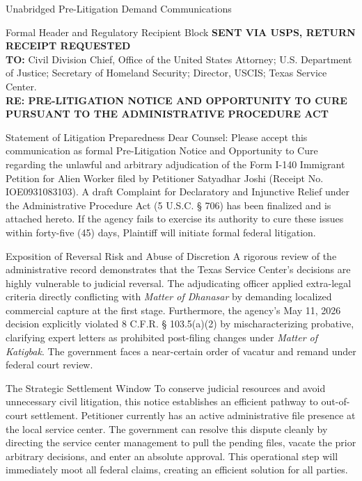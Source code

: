 \documentclass[11pt]{beamer}
\begin{document}
	\begin{frame}[allowframebreaks]{Unabridged Pre-Litigation Demand Communications}
		\scriptsize
		\begin{block}{Formal Header and Regulatory Recipient Block}
			\textbf{SENT VIA USPS, RETURN RECEIPT REQUESTED} \\
			\vspace{0.2cm}
			\textbf{TO:} Civil Division Chief, Office of the United States Attorney; U.S. Department of Justice; Secretary of Homeland Security; Director, USCIS; Texas Service Center. \\
			\vspace{0.2cm}
			\textbf{RE: PRE-LITIGATION NOTICE AND OPPORTUNITY TO CURE PURSUANT TO THE ADMINISTRATIVE PROCEDURE ACT}
		\end{block}
		\framebreak
		\begin{block}{Statement of Litigation Preparedness}
			Dear Counsel: Please accept this communication as formal Pre-Litigation Notice and Opportunity to Cure regarding the unlawful and arbitrary adjudication of the Form I-140 Immigrant Petition for Alien Worker filed by Petitioner Satyadhar Joshi (Receipt No. IOE0931083103). A draft Complaint for Declaratory and Injunctive Relief under the Administrative Procedure Act (5 U.S.C. § 706) has been finalized and is attached hereto. If the agency fails to exercise its authority to cure these issues within forty-five (45) days, Plaintiff will initiate formal federal litigation.
		\end{block}
		\framebreak
		\begin{block}{Exposition of Reversal Risk and Abuse of Discretion}
			A rigorous review of the administrative record demonstrates that the Texas Service Center's decisions are highly vulnerable to judicial reversal. The adjudicating officer applied extra-legal criteria directly conflicting with \textit{Matter of Dhanasar} by demanding localized commercial capture at the first stage. Furthermore, the agency's May 11, 2026 decision explicitly violated 8 C.F.R. § 103.5(a)(2) by mischaracterizing probative, clarifying expert letters as prohibited post-filing changes under \textit{Matter of Katigbak}. The government faces a near-certain order of vacatur and remand under federal court review.
		\end{block}
		\framebreak
		\begin{block}{The Strategic Settlement Window}
			To conserve judicial resources and avoid unnecessary civil litigation, this notice establishes an efficient pathway to out-of-court settlement. Petitioner currently has an active administrative file presence at the local service center. The government can resolve this dispute cleanly by directing the service center management to pull the pending files, vacate the prior arbitrary decisions, and enter an absolute approval. This operational step will immediately moot all federal claims, creating an efficient solution for all parties.
		\end{block}
	\end{frame}
	
\end{document}

